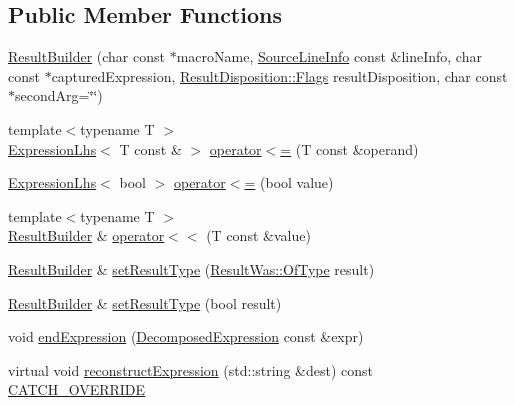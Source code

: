 \subsection*{Public Member Functions}
\begin{DoxyCompactItemize}
\item 
\hyperlink{class_catch_1_1_result_builder_a8579c3056f64f9324cf1181532828376}{Result\-Builder} (char const $\ast$macro\-Name, \hyperlink{struct_catch_1_1_source_line_info}{Source\-Line\-Info} const \&line\-Info, char const $\ast$captured\-Expression, \hyperlink{struct_catch_1_1_result_disposition_a3396cad6e2259af326b3aae93e23e9d8}{Result\-Disposition\-::\-Flags} result\-Disposition, char const $\ast$second\-Arg=\char`\"{}\char`\"{})
\item 
{\footnotesize template$<$typename T $>$ }\\\hyperlink{class_catch_1_1_expression_lhs}{Expression\-Lhs}$<$ T const \& $>$ \hyperlink{class_catch_1_1_result_builder_a1829db87e701758c4c520988883b25b5}{operator$<$=} (T const \&operand)
\item 
\hyperlink{class_catch_1_1_expression_lhs}{Expression\-Lhs}$<$ bool $>$ \hyperlink{class_catch_1_1_result_builder_a3b87b20bcd1ef9e630880e59eeefba2a}{operator$<$=} (bool value)
\item 
{\footnotesize template$<$typename T $>$ }\\\hyperlink{class_catch_1_1_result_builder}{Result\-Builder} \& \hyperlink{class_catch_1_1_result_builder_a5aa79ce6160ab8cd800eb65bbd7a28a4}{operator$<$$<$} (T const \&value)
\item 
\hyperlink{class_catch_1_1_result_builder}{Result\-Builder} \& \hyperlink{class_catch_1_1_result_builder_af896e372db9d7fc90ddeceff3ad110d0}{set\-Result\-Type} (\hyperlink{struct_catch_1_1_result_was_a624e1ee3661fcf6094ceef1f654601ef}{Result\-Was\-::\-Of\-Type} result)
\item 
\hyperlink{class_catch_1_1_result_builder}{Result\-Builder} \& \hyperlink{class_catch_1_1_result_builder_ae504348b073d0360bfd5fc33347ec689}{set\-Result\-Type} (bool result)
\item 
void \hyperlink{class_catch_1_1_result_builder_a864e03b7300271de7cc44b9864463c5a}{end\-Expression} (\hyperlink{struct_catch_1_1_decomposed_expression}{Decomposed\-Expression} const \&expr)
\item 
virtual void \hyperlink{class_catch_1_1_result_builder_a7d94b15cf04301a8617e7b16158b5d82}{reconstruct\-Expression} (std\-::string \&dest) const \hyperlink{catch_8hpp_a8ecdce4d3f57835f707915ae831eb847}{C\-A\-T\-C\-H\-\_\-\-O\-V\-E\-R\-R\-I\-D\-E}

\end{DoxyCompactItemize}
